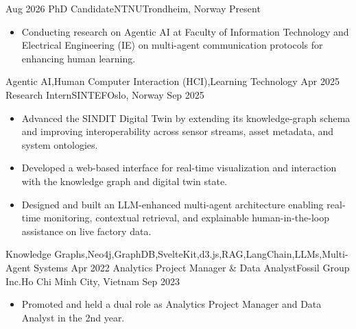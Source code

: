 %
%
%

\begin{experiences}
  \experience
    {Aug 2026}   {PhD Candidate}{NTNU}{Trondheim, Norway}
    {Present} {
                      \begin{itemize}
                        \item Conducting research on Agentic AI at Faculty of Information Technology and Electrical Engineering (IE) on multi-agent communication protocols for enhancing human learning.
                      \end{itemize}
                    }
                    {Agentic AI,Human Computer Interaction (HCI),Learning Technology}
  \emptySeparator
  \experience
    {Apr 2025}   {Research Intern}{SINTEF}{Oslo, Norway}
    {Sep 2025} {
                      \begin{itemize}
                        \item Advanced the SINDIT Digital Twin by extending its knowledge-graph schema and improving interoperability across sensor streams, asset metadata, and system ontologies.
                        \item Developed a web-based interface for real-time visualization and interaction with the knowledge graph and digital twin state.
                        \item Designed and built an LLM-enhanced multi-agent architecture enabling real-time monitoring, contextual retrieval, and explainable human-in-the-loop assistance on live factory data.
                      \end{itemize}
                    }
                    {Knowledge Graphs,Neo4j,GraphDB,SvelteKit,d3.js,RAG,LangChain,LLMs,Multi-Agent Systems}
  \emptySeparator
  \experience
    {Apr 2022} {Analytics Project Manager \& Data Analyst}{Fossil Group Inc.}{Ho Chi Minh City, Vietnam}
    {Sep 2023}    {
                      \begin{itemize}
                        \item Promoted and held a dual role as Analytics Project Manager and Data Analyst in the 2nd year.

\end{itemize}}
\end{experiences}
